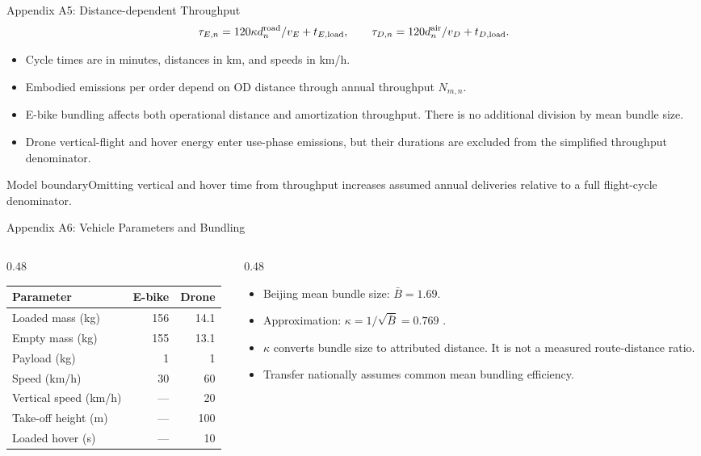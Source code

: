 \documentclass[9pt]{beamer}
\begin{document}
\begin{frame}{Appendix A5: Distance-dependent Throughput}
\label{app:emission:5}
\[
\tau_{E,n}=120\kappa d_n^{\rm road}/v_E+t_{E,\rm load},\qquad
\tau_{D,n}=120d_n^{\rm air}/v_D+t_{D,\rm load}.
\]
\begin{itemize}
\item Cycle times are in minutes, distances in km, and speeds in km/h.
\item Embodied emissions per order depend on OD distance through annual throughput $N_{m,n}$.
\item E-bike bundling affects both operational distance and amortization throughput. There is no additional division by mean bundle size.
\item Drone vertical-flight and hover energy enter use-phase emissions, but their durations are excluded from the simplified throughput denominator.
\end{itemize}
\begin{block}{Model boundary}Omitting vertical and hover time from throughput increases assumed annual deliveries relative to a full flight-cycle denominator.\end{block}

\end{frame}

\begin{frame}{Appendix A6: Vehicle Parameters and Bundling}
\label{app:emission:6}
\small
\begin{columns}[T]
\begin{column}{0.48\textwidth}
\begin{tabular}{lrr}
\toprule Parameter & E-bike & Drone\\\midrule
Loaded mass (kg) & 156 & 14.1\\
Empty mass (kg) & 155 & 13.1\\
Payload (kg) & 1 & 1\\
Speed (km/h) & 30 & 60\\
Vertical speed (km/h) & --- & 20\\
Take-off height (m) & --- & 100\\
Loaded hover (s) & --- & 10\\
\bottomrule
\end{tabular}
\end{column}
\begin{column}{0.48\textwidth}
\begin{itemize}
\item Beijing mean bundle size: $\bar B=1.69$.
\item Approximation: $\kappa=1/\sqrt{\bar B}=0.769$ \parencite{beardwood_shortest_1959}.
\item $\kappa$ converts bundle size to attributed distance. It is not a measured route-distance ratio.
\item Transfer nationally assumes common mean bundling efficiency.
\end{itemize}
\end{column}
\end{columns}
\end{frame}
\end{document}
